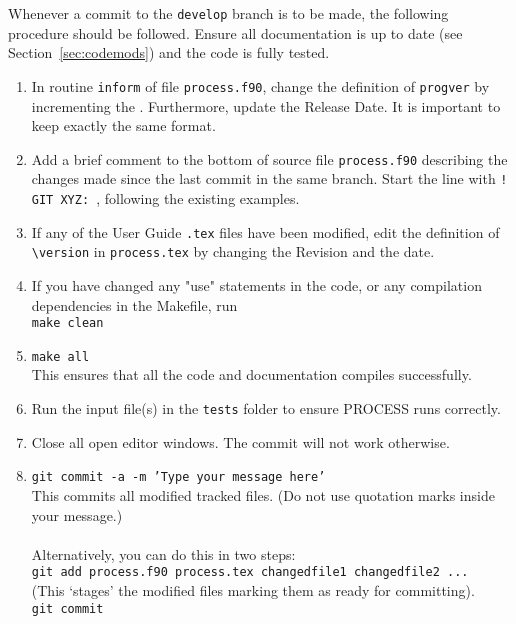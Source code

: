 \documentclass[11pt,a4paper]{report}
\newcommand{\version}{
04 October 2017
\hfill
PROCESS version: 1.0.12
}
\begin{document}
Whenever a commit to the \texttt{develop} branch is to be made, the following
procedure should be followed. Ensure all documentation is up to date (see
Section~\ref{sec:codemods}) and the code is fully tested.
\begin{enumerate}

\item In routine \texttt{inform} of file \texttt{process.f90}, change the
  definition of \texttt{progver} by incrementing the . Furthermore, update the Release Date. It is important to keep exactly the same format.

\item Add a brief comment to the bottom of source file \texttt{process.f90}
  describing the changes made since the last commit in the same branch. Start
  the line with \texttt{! GIT XYZ: }, following the existing examples.

\item If any of the User Guide \texttt{.tex} files have been modified, edit
  the definition of \verb+\version+ in \texttt{process.tex} by changing the
  Revision  and the date.

\item If you have changed any "use" statements in the code, or any compilation dependencies in the Makefile, run \\
\texttt{make clean}

\item \texttt{make all} \\
This ensures that all the code and documentation compiles successfully.

\item Run the input file(s) in the \texttt{tests} folder to ensure PROCESS runs correctly.

\item
Close all open editor windows.  The commit will not work otherwise.

\item   \texttt{git commit -a -m 'Type your message here'} \\
  This commits all modified tracked files. (Do not use quotation marks inside your message.)\\
  \\
  Alternatively, you can do this in two steps:\\
  \texttt{git add process.f90 process.tex changedfile1 changedfile2 ...}  \\
  (This `stages' the modified files marking them as ready for committing).  \\
  \texttt{git commit}


\end{enumerate}
\end{document}
